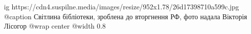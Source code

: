  
 
 
 
 

\ifcmt
  ig https://cdn4.suspilne.media/images/resize/952x1.78/26d17398710a599c.jpg
	@caption Світлина бібліотеки, зроблена до вторгнення РФ, фото надала Вікторія Лісогор 
  @wrap center
  @width 0.8
\fi
